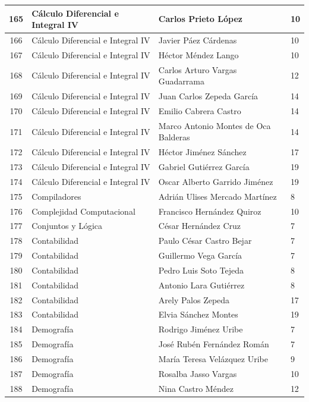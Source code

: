 {\begin{longtable}{|c|p{6.5cm}|p{5cm}|p{1.5cm}|}
  165 & Cálculo Diferencial e Integral IV & Carlos Prieto López & 10 \\ \hline
  166 & Cálculo Diferencial e Integral IV & Javier Páez Cárdenas & 10 \\ \hline
  167 & Cálculo Diferencial e Integral IV & Héctor Méndez Lango & 10 \\ \hline
  168 & Cálculo Diferencial e Integral IV & Carlos Arturo Vargas Guadarrama & 12 \\ \hline
  169 & Cálculo Diferencial e Integral IV & Juan Carlos Zepeda García & 14 \\ \hline
  170 & Cálculo Diferencial e Integral IV & Emilio Cabrera Castro & 14 \\ \hline
  171 & Cálculo Diferencial e Integral IV & Marco Antonio Montes de Oca Balderas & 14 \\ \hline
  172 & Cálculo Diferencial e Integral IV & Héctor Jiménez Sánchez & 17 \\ \hline
  173 & Cálculo Diferencial e Integral IV & Gabriel Gutiérrez García & 19 \\ \hline
  174 & Cálculo Diferencial e Integral IV & Oscar Alberto Garrido Jiménez & 19 \\ \hline
  175 & Compiladores & Adrián Ulises Mercado Martínez & 8 \\ \hline
  176 & Complejidad Computacional & Francisco Hernández Quiroz & 10 \\ \hline
  177 & Conjuntos y Lógica & César Hernández Cruz & 7 \\ \hline
  178 & Contabilidad & Paulo César Castro Bejar & 7 \\ \hline
  179 & Contabilidad & Guillermo Vega García & 7 \\ \hline
  180 & Contabilidad & Pedro Luis Soto Tejeda & 8 \\ \hline
  181 & Contabilidad & Antonio Lara Gutiérrez & 8 \\ \hline
  182 & Contabilidad & Arely Palos Zepeda & 17 \\ \hline
  183 & Contabilidad & Elvia Sánchez Montes & 19 \\ \hline
  184 & Demografía & Rodrigo Jiménez Uribe & 7 \\ \hline
  185 & Demografía & José Rubén Fernández Román & 7 \\ \hline
  186 & Demografía & María Teresa Velázquez Uribe & 9 \\ \hline
  187 & Demografía & Rosalba Jasso Vargas & 10 \\ \hline
  188 & Demografía & Nina Castro Méndez & 12 \\ \hline

\end{longtable}}
